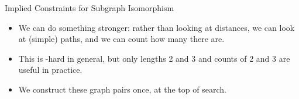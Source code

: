 \documentclass{beamer}
\begin{document}
\begin{frame}{Implied Constraints for Subgraph Isomorphism}
{
        \vspace{1em}
    }

     {
        \begin{itemize}
            \item We can do something stronger: rather than looking at distances, we can look at
                (simple) paths, and we can count how many there are.

            \item This is \NP-hard in general, but only lengths 2 and 3 and counts of 2 and 3 are
                useful in practice.

            \item We construct these graph pairs once, at the top of search.
        \end{itemize}
    }

\end{frame}
\end{document}
